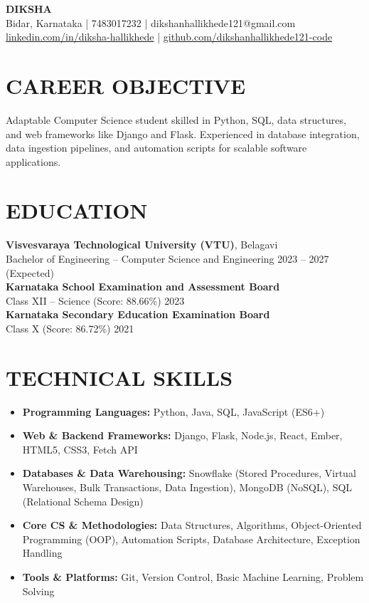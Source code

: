 \documentclass{article}
\begin{document}
\begin{center}
    {\Huge \textbf{DIKSHA}} \\[6pt]
    Bidar, Karnataka | 7483017232 | dikshanhallikhede121@gmail.com \\
    \href{https://linkedin.com/in/diksha-hallikhede}{linkedin.com/in/diksha-hallikhede} | \href{https://github.com/dikshanhallikhede121-code}{github.com/dikshanhallikhede121-code}
\end{center}

\vspace{0.2cm}

\section*{CAREER OBJECTIVE}
Adaptable Computer Science student skilled in Python, SQL, data structures, and web frameworks like Django and Flask. Experienced in database integration, data ingestion pipelines, and automation scripts for scalable software applications.

\section*{EDUCATION}
\textbf{Visvesvaraya Technological University (VTU)}, Belagavi \\
Bachelor of Engineering – Computer Science and Engineering \hfill 2023 – 2027 (Expected) \\[4pt]
\textbf{Karnataka School Examination and Assessment Board} \\
Class XII – Science (Score: 88.66\%) \hfill 2023 \\[4pt]
\textbf{Karnataka Secondary Education Examination Board} \\
Class X (Score: 86.72\%) \hfill 2021

\section*{TECHNICAL SKILLS}
\begin{itemize}
    \item \textbf{Programming Languages:} Python, Java, SQL, JavaScript (ES6+)
    \item \textbf{Web \& Backend Frameworks:} Django, Flask, Node.js, React, Ember, HTML5, CSS3, Fetch API
    \item \textbf{Databases \& Data Warehousing:} Snowflake (Stored Procedures, Virtual Warehouses, Bulk Transactions, Data Ingestion), MongoDB (NoSQL), SQL (Relational Schema Design)
    \item \textbf{Core CS \& Methodologies:} Data Structures, Algorithms, Object-Oriented Programming (OOP), Automation Scripts, Database Architecture, Exception Handling
    \item \textbf{Tools \& Platforms:} Git, Version Control, Basic Machine Learning, Problem Solving
\end{itemize}
\end{document}
